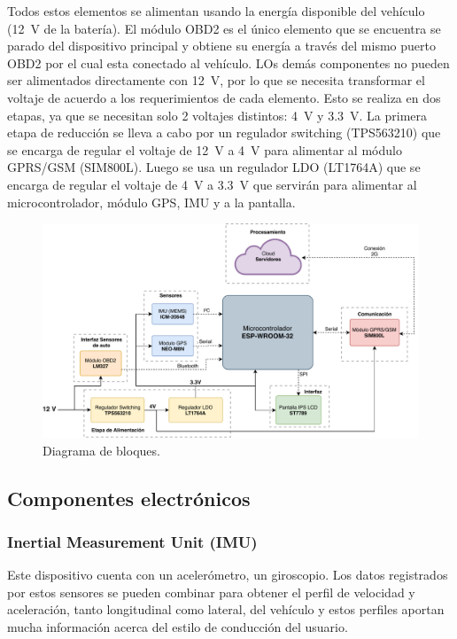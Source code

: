 Todos estos elementos se alimentan usando la energía disponible del vehículo (\SI{12}{V} de la batería). El módulo OBD2 es el único elemento que se encuentra se parado del dispositivo principal y obtiene su energía a través del mismo puerto OBD2 por el cual esta conectado al vehículo. LOs demás componentes no pueden ser alimentados directamente con \SI{12}{V}, por lo que se necesita transformar el voltaje de acuerdo a los requerimientos de cada elemento. Esto se realiza en dos etapas, ya que se necesitan solo 2 voltajes distintos: \SI{4}{V} y \SI{3.3}{V}. La primera etapa de reducción se lleva a cabo por un regulador switching (TPS563210) que se encarga de regular el voltaje de \SI{12}{V} a \SI{4}{V} para alimentar al módulo GPRS/GSM (SIM800L). Luego se usa un regulador LDO (LT1764A) que se encarga de regular el voltaje de \SI{4}{V} a \SI{3.3}{V} que servirán para alimentar al microcontrolador, módulo GPS, IMU y a la pantalla.


\begin{figure}[htbp!]
\centering
\includegraphics[width=\textwidth]{Bloques_principal.pdf}
\caption{Diagrama de bloques.}
\label{fig:bloques}
\end{figure}

\subsection{Componentes electrónicos}


\subsubsection{Inertial Measurement Unit (IMU)}
Este dispositivo cuenta con un acelerómetro, un giroscopio. Los datos registrados por estos sensores se pueden combinar para obtener el perfil de velocidad y aceleración, tanto longitudinal como lateral, del vehículo y estos perfiles aportan mucha información acerca del estilo de conducción del usuario.

